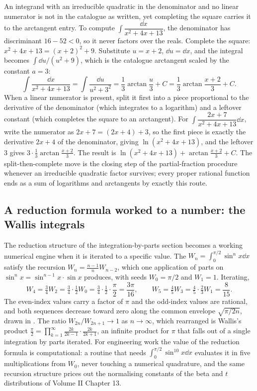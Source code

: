 An integrand with an irreducible quadratic in the denominator and no
linear numerator is not in the catalogue as written, yet completing the
square carries it to the arctangent entry. To compute $\int
\dfrac{\dd x}{x^{2} + 4x + 13}$, the denominator has discriminant
$16 - 52 < 0$, so it never factors over the reals. Complete the square:
$x^{2} + 4x + 13 = (x + 2)^{2} + 9$. Substitute $u = x + 2$, $\dd u =
\dd x$, and the integral becomes $\int \dd u/(u^{2} + 9)$, which is the
catalogue arctangent scaled by the constant $a = 3$:
\[
\int\frac{\dd x}{x^{2} + 4x + 13} = \int\frac{\dd u}{u^{2} + 3^{2}} =
\frac{1}{3}\arctan\frac{u}{3} + C = \frac{1}{3}\arctan\frac{x + 2}{3} +
C.
\]
When a linear numerator is present, split it first into a piece
proportional to the derivative of the denominator (which integrates to a
logarithm) and a leftover constant (which completes the square to an
arctangent). For $\int\dfrac{2x + 7}{x^{2} + 4x + 13}\dd x$, write the
numerator as $2x + 7 = (2x + 4) + 3$, so the first piece is exactly the
derivative $2x + 4$ of the denominator, giving $\ln(x^{2} + 4x + 13)$,
and the leftover $3$ gives $3\cdot\tfrac{1}{3}\arctan\tfrac{x+2}{3}$. The
result is $\ln(x^{2} + 4x + 13) + \arctan\tfrac{x + 2}{3} + C$. The
split-then-complete move is the closing step of the partial-fraction
procedure whenever an irreducible quadratic factor survives; every
proper rational function ends as a sum of logarithms and arctangents by
exactly this route.

\subsection{A reduction formula worked to a number: the Wallis integrals}

The reduction structure of the integration-by-parts section becomes a
working numerical engine when it is iterated to a specific value. The
 $W_{n} = \int_{0}^{\pi/2}\sin^{n}x\dd x$
satisfy the recursion $W_{n} = \tfrac{n-1}{n}W_{n-2}$, which one
application of parts on $\sin^{n}x = \sin^{n-1}x\cdot\sin x$ produces,
with seeds $W_{0} = \pi/2$ and $W_{1} = 1$. Iterating,
\[
W_{4} = \tfrac{3}{4}W_{2} = \tfrac{3}{4}\cdot\tfrac{1}{2}W_{0} =
\tfrac{3}{4}\cdot\tfrac{1}{2}\cdot\frac{\pi}{2} = \frac{3\pi}{16},
\qquad
W_{5} = \tfrac{4}{5}W_{3} = \tfrac{4}{5}\cdot\tfrac{2}{3}W_{1} =
\frac{8}{15}.
\]
The even-index values carry a factor of $\pi$ and the odd-index values
are rational, and both sequences decrease toward zero along the common
envelope $\sqrt{\pi/2n}$, drawn in
. The ratio $W_{2n}/W_{2n+1} \to 1$
as $n \to \infty$, which rearranged is Wallis's product $\frac{\pi}{2} =
\prod_{k=1}^{\infty}\frac{2k}{2k-1}\cdot\frac{2k}{2k+1}$, an infinite
product for $\pi$ that falls out of a single integration by parts
iterated. For engineering work the value of the reduction formula is
computational: a routine that needs $\int_{0}^{\pi/2}\sin^{10}x\dd x$
evaluates it in five multiplications from $W_{0}$, never touching a
numerical quadrature, and the same recursion structure prices out the
normalising constants of the beta and $t$ distributions of Volume II
Chapter 13.

